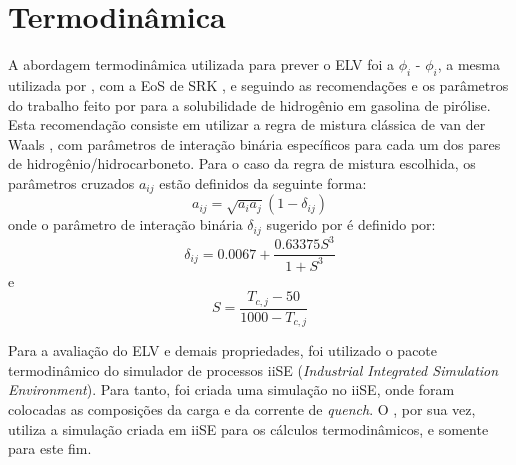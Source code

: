 
\section{Termodinâmica} \label{sec:termodinamica}

A abordagem termodinâmica utilizada para prever o ELV foi a $\phi_i$ -
$\phi_i$, a mesma utilizada por , com a EoS de SRK
\cite{Soave1972}, e seguindo as recomendações e os parâmetros do trabalho feito
por  para a solubilidade de hidrogênio em gasolina de
pirólise. Esta recomendação consiste em utilizar a regra de mistura clássica de
van der Waals \cite{VanderWaals1873}, com parâmetros de interação binária
específicos para cada um dos pares de hidrogênio/hidrocarboneto. Para o caso da
regra de mistura escolhida, os parâmetros cruzados $a_{ij}$ estão definidos
da seguinte forma\cite{Peng1976,Soave1972}:
\begin{equation}
a_{ij} = \sqrt{a_ia_j}(1-\delta_{ij})
\label{eq:parametroaij}
\end{equation}
onde o parâmetro de interação binária $\delta_{ij}$ sugerido por
 é definido por:
\begin{equation}
\delta_{ij} = \num{0,0067}+\dfrac{\num{0,63375}S^3}{1+S^3}
\label{eq:deltaij}
\end{equation}
e
\begin{equation}
S = \dfrac{T_{c,j}-\num{50}}{\num{1000}-T_{c,j}}
\label{eq:deltaij}
\end{equation}

Para a avaliação do ELV e demais propriedades, foi utilizado o pacote
termodinâmico do simulador de processos iiSE (\emph{Industrial Integrated
Simulation Environment}). Para tanto, foi criada uma simulação no iiSE, onde
foram colocadas as composições da carga e da corrente de \emph{quench}. O \emso,
por sua vez, utiliza a simulação criada em iiSE para os cálculos termodinâmicos,
e somente para este fim. 

